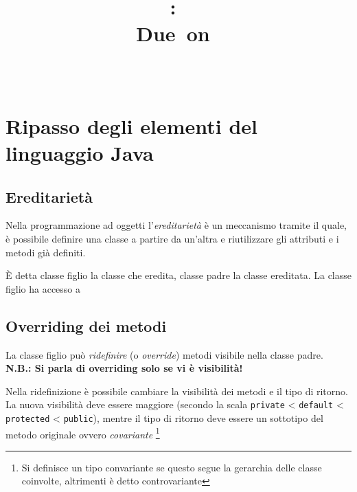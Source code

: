 \documentclass{article}
\title{
\vspace{2in}
\textmd{\textbf{\hmwkClass:\ \hmwkTitle}}\\
\normalsize\vspace{0.1in}\small{Due\ on\ \hmwkDueDate}\\
\vspace{0.1in}\large{\textit{\hmwkClassInstructor\ \hmwkClassTime}}
\vspace{3in}
}
\author{\textbf{\hmwkAuthorName}}
\date{} %
\begin{document}
\maketitle



\newpage
\tableofcontents
\newpage

\theoremstyle{definition} 

\newtheorem{mydef}{Definition}
\newtheorem{lemma}{Lemma}

\newtheorem{theorem}{Theorem}[section]

\section{Ripasso degli elementi del linguaggio Java}
\subsection{Ereditarietà}

Nella programmazione ad oggetti l'\emph{ereditarietà} è un meccanismo tramite il quale,
è possibile definire una classe a partire da un'altra e riutilizzare gli attributi e i metodi
già definiti.

È detta classe figlio la classe che eredita, classe padre la classe ereditata.
La classe figlio ha accesso a

\subsection{Overriding dei metodi}

La classe figlio può \emph{ridefinire} (o \emph{override}) metodi visibile nella classe padre.
\textbf{N.B.: Si parla di overriding solo se vi è visibilità!}

Nella ridefinizione è possibile cambiare la visibilità dei metodi e il tipo di ritorno.
La nuova visibilità deve essere maggiore (secondo la scala \texttt{private} < \texttt{default} < \texttt{protected} < \texttt{public}), mentre il tipo di ritorno deve essere un sottotipo del metodo
originale ovvero \emph{covariante} \footnote{Si definisce un tipo convariante se questo segue la gerarchia delle classe coinvolte, altrimenti è detto controvariante}
\end{document}
